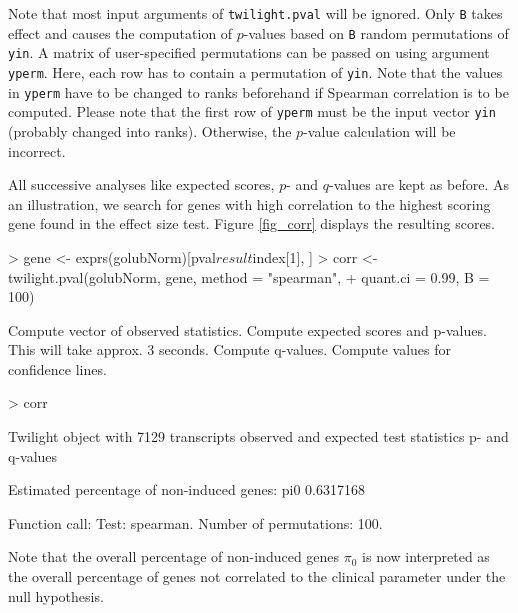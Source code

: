 \documentclass[11pt,a4paper,fleqn]{report}
\newcommand{\Rfunction}[1]{{\texttt{#1}}}
\newcommand{\Rfunarg}[1]{{\texttt{#1}}}
\begin{document}
Note that most input arguments of \Rfunction{twilight.pval} will be ignored. Only \Rfunarg{B} takes effect and causes the computation of $p$-values based on \Rfunarg{B} random permutations of \Rfunarg{yin}. A matrix of user-specified permutations can be passed on using argument \Rfunarg{yperm}. Here, each row has to contain a permutation of \Rfunarg{yin}. Note that the values in \Rfunarg{yperm} have to be changed to ranks beforehand if Spearman correlation is to be computed. Please note that the first row of \Rfunarg{yperm} must be the input vector \Rfunarg{yin} (probably changed into ranks). Otherwise, the $p$-value calculation will be incorrect.

All successive analyses like expected scores, $p$- and $q$-values are kept as before. As an illustration, we search for genes with high correlation to the highest scoring gene found in the effect size test. Figure \ref{fig_corr} displays the resulting scores.

\begin{Schunk}
\begin{Sinput}
> gene <- exprs(golubNorm)[pval$result$index[1], ]
> corr <- twilight.pval(golubNorm, gene, method = "spearman", 
+     quant.ci = 0.99, B = 100)
\end{Sinput}
\begin{Soutput}
Compute vector of observed statistics. 
Compute expected scores and p-values. This will take approx. 3 seconds. 
Compute q-values. 
Compute values for confidence lines. 
\end{Soutput}
\begin{Sinput}
> corr
\end{Sinput}
\begin{Soutput}
 Twilight object with
     7129 transcripts
     observed and expected test statistics
     p- and q-values

 Estimated percentage of non-induced genes:
      pi0 
0.6317168 

 Function call:
 Test: spearman. Number of permutations: 100. 
\end{Soutput}
\end{Schunk}

Note that the overall percentage of non-induced genes $\pi_0$ is now interpreted as the overall percentage of genes not correlated to the clinical parameter under the null hypothesis.
\end{document}
